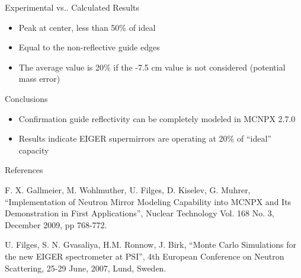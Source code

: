 \documentclass[final,t]{beamer}
\makeatletter
\DeclareRobustCommand\onedot{\futurelet\@let@token\@onedot}
\def\@onedot{\ifx\@let@token.\else.\null\fi\xspace}
\def\vs{{vs}\onedot}
\makeatother
\begin{document}
\begin{frame}{}
\begin{columns}[t]
\begin{column}{.3\linewidth}
\begin{block}{Experimental \vs Calculated Results}
      \begin{itemize}
      \item Peak at center, less than 50\% of ideal
      \item Equal to the non-reflective guide edges
      \item The average value is 20\% if the -7.5 cm value is not considered (potential mass error)
      \end{itemize}
      


      \end{block}



      \begin{block}{\alert{Conclusions}}
        \begin{itemize}
        \item Confirmation guide reflectivity can be completely modeled in MCNPX 2.7.0
        \item Results indicate EIGER supermirrors are operating at 20\% of ``ideal'' capacity 
        \end{itemize}
        \vspace{-1ex}
      \end{block}



            \begin{block}{References}

      
        \begin{thebibliography}{9}   %
\scriptsize
{}
  F. X. Gallmeier, M. Wohlmuther, U. Filges, D. Kiselev, G. Muhrer,
  ``Implementation of Neutron Mirror Modeling Capability into MCNPX and Its Demonstration in First Applications'',
  Nuclear Technology Vol. 168 No. 3, December 2009, pp 768-772. 

  U. Filges, S. N. Gvasaliya, H.M. Ronnow, J. Birk,
  ``Monte Carlo Simulations for the new EIGER spectrometer at PSI'',
  4th European Conference on Neutron Scattering, 25-29 June, 2007, Lund, Sweden. 


\end{thebibliography}
\end{block}
\end{column}
\end{columns}
\end{frame}
\end{document}
